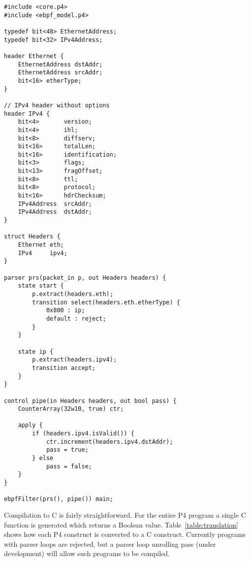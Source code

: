 \begin{lstlisting}
#include <core.p4>
#include <ebpf_model.p4>

typedef bit<48> EthernetAddress;
typedef bit<32> IPv4Address;

header Ethernet {
    EthernetAddress dstAddr;
    EthernetAddress srcAddr;
    bit<16> etherType;
}

// IPv4 header without options
header IPv4 {
    bit<4>       version;
    bit<4>       ihl;
    bit<8>       diffserv;
    bit<16>      totalLen;
    bit<16>      identification;
    bit<3>       flags;
    bit<13>      fragOffset;
    bit<8>       ttl;
    bit<8>       protocol;
    bit<16>      hdrChecksum;
    IPv4Address  srcAddr;
    IPv4Address  dstAddr;
}

struct Headers {
    Ethernet eth;
    IPv4     ipv4;
}

parser prs(packet_in p, out Headers headers) {
    state start {
        p.extract(headers.eth);
        transition select(headers.eth.etherType) {
            0x800 : ip;
            default : reject;
        }
    }

    state ip {
        p.extract(headers.ipv4);
        transition accept;
    }
}

control pipe(in Headers headers, out bool pass) {
    CounterArray(32w10, true) ctr;

    apply {
        if (headers.ipv4.isValid()) {
            ctr.increment(headers.ipv4.dstAddr);
            pass = true;
        } else
            pass = false;
    }
}

ebpfFilter(prs(), pipe()) main;
\end{lstlisting}

Compilation to C is fairly straightforward.  For the entire P4 program
a single C function is generated which returns a Boolean value.
Table~\ref{table:translation} shows how each P4 construct is converted
to a C construct.  Currently programs with parser loops are rejected,
but a parser loop unrolling pass (under development) will allow such
programs to be compiled.


